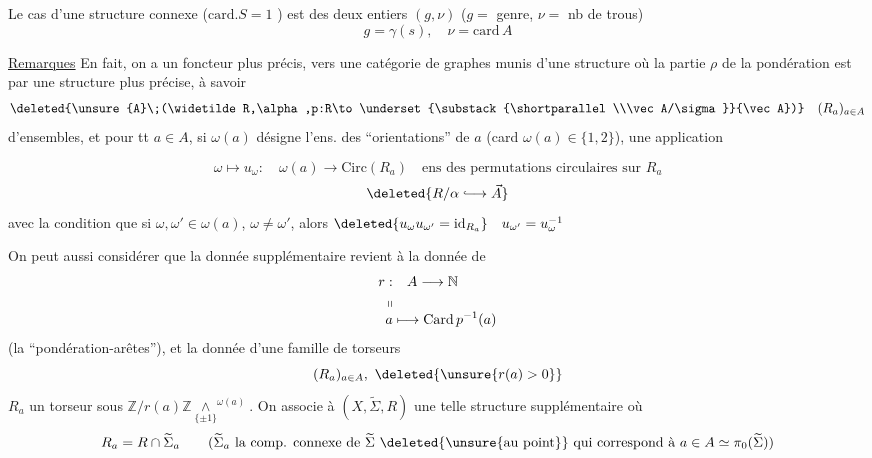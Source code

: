  Le cas d'une structure connexe ($\mathrm{card}.S=1$ ) est   des deux entiers $(g,\nu)$ \quad ($g=$ genre, $\nu={}$ nb de trous)
\[
 g=\gamma(s),\quad \nu=\mathrm{card}\,A
\]


\uline{Remarques} \quad En fait, on a un foncteur plus précis, vers une catégorie de graphes munis d'une structure où la partie $\rho$ de la pondération est    par une structure plus précise, à savoir  
\[
 \deleted{\unsure{A}\;(\widetilde R,\alpha,p:R\to\underset{\substack{\shortparallel\\\vec A/\sigma}}{\vec A})}\quad (R_a)_{a\in A}
\]
d'ensembles, et pour tt $a\in A$, si $\omega(a)$ désigne l'ens. des   ``orientations'' de $a$ (card $\omega(a)\in\{1,2\}$), une application


\[
 \omega\longmapsto u_\omega:\quad \omega(a)\longrightarrow\mathrm{Circ}(R_a)
 \quad\text{ens des permutations circulaires sur $R_a$}
\]
\[
 \deleted{R/\alpha\lhook\joinrel\longrightarrow\vec A}
\]
avec la condition que si $\omega,\omega'\in\omega(a)$, $\omega\ne\omega'$, alors $\deleted{u_\omega u_{\omega'}=\mathrm{id}_{R_a}}\quad u_{\omega'}=u_\omega^{-1}$

On peut aussi considérer que la donnée supplémentaire revient à la donnée de
\[
 \begin{aligned}
 r:&\quad A\longrightarrow\mathbb N\\
 \shortparallel&\\[-4pt]
 a&\longmapsto\mathrm{Card}\,p^{-1}(a)
 \end{aligned}
\]
(la ``pondération-arêtes''), et la donnée d'une famille de torseurs
\[
 (R_a)_{a\in A},\ \deleted{\unsure{r(a)>0}}
\]
$R_a$ un torseur sous $\mathbb Z/r(a)\mathbb Z\mathbin{\underset{\{\pm1\}}{\wedge}}^{\omega(a)}$. On associe à $(X,\widetilde\Sigma,R)$ une telle structure supplémentaire où
\[
 R_a=R\cap\widetilde\Sigma_a
 \qquad\text{($\widetilde\Sigma_a$ la comp. connexe de $\widetilde\Sigma$ \deleted{\unsure{au point}} qui correspond à $a\in A\simeq\pi_0(\widetilde\Sigma)$)}
\]

